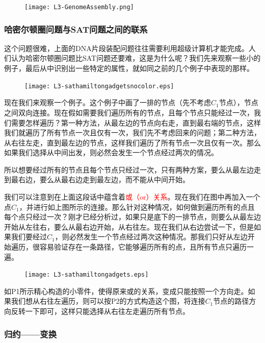 \begin{figure}[H]
\centering
 \texttt{[image: L3-GenomeAssembly.png]}
\end{figure}

\subsubsection{哈密尔顿圈问题与SAT问题之间的联系}

这个问题很难，上面的DNA片段装配问题往往需要利用超级计算机才能完成。人们认为哈密尔顿圈问题比SAT问题还要难，这是为什么呢？我们先来观察一些小的例子，最后从中识别出一些特定的属性，就如同之前的几个例子中表现的那样。

\begin{figure}[H]
\centering
 \texttt{[image: L3-sathamiltongadgetsnocolor.eps]}
\end{figure}

现在我们来观察一个例子。这个例子中画了一排的节点（先不考虑$C_1$节点），节点之间双向连接。现在假如需要我们遍历所有的节点，且每个节点只能经过一次，我们需要怎样遍历？第一种方法，从最左边的节点向右走，直到最右端的节点，这样我们就遍历了所有节点一次且仅有一次，我们先不考虑回来的问题；第二种方法，从右往左走，直到最左边的节点，这样我们遍历了所有节点一次且仅有一次。那么如果我们选择从中间出发，则必然会发生一个节点经过两次的情况。

所以想要经过所有的节点且每个节点只经过一次，只有两种方案，要么从最左边走到最右边，要么从最右边走到最左边，而不能从中间开始。

我们可以注意到在上面这段话中蕴含着\textcolor{red}{或（or）关系}。现在我们在图中再加入一个点$C_1$，并进行如上图所示的连接。那么针对这种情况，如何做到遍历所有的点且每个点只经过一次？刚才已经分析过，如果只是底下的一排节点，则要么从最左边开始从左往右，要么从最右边开始，从右往左。现在我们从右边尝试一下，但是如果我们要经过$C_1$，则必然发生一个节点经过两次这种情况。那我们只好从左边开始遍历，很容易验证存在一条路径，它能够遍历所有的点，且所有节点只遍历一遍。

\begin{figure}[H]
\centering
 \texttt{[image: L3-sathamiltongadgets.eps]}
\end{figure}

如P1所示精心构造的小零件，使得原来或的关系，变成只能按照一个方向走。如果我们想从右往左遍历，则可以按P2的方式构造这个图，将连接$C_1$节点的路径方向反转一下即可，这样只能选择从右往左走遍历所有节点。

\subsubsection{归约——变换}

